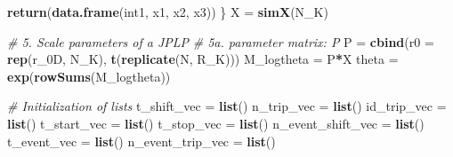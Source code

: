\documentclass[
]{article}
\newenvironment{Shaded}{\begin{snugshade}}{\end{snugshade}}
\newcommand{\CommentTok}[1]{\textcolor[rgb]{0.56,0.35,0.01}{\textit{#1}}}
\newcommand{\DataTypeTok}[1]{\textcolor[rgb]{0.13,0.29,0.53}{#1}}
\newcommand{\KeywordTok}[1]{\textcolor[rgb]{0.13,0.29,0.53}{\textbf{#1}}}
\newcommand{\NormalTok}[1]{#1}
\newcommand{\OperatorTok}[1]{\textcolor[rgb]{0.81,0.36,0.00}{\textbf{#1}}}
\newcommand{\StringTok}[1]{\textcolor[rgb]{0.31,0.60,0.02}{#1}}
\begin{document}
\begin{Shaded}
\begin{Highlighting}[]
    \KeywordTok{return}\NormalTok{(}\KeywordTok{data.frame}\NormalTok{(int1, x1, x2, x3))}
\NormalTok{  \}}
\NormalTok{  X =}\StringTok{ }\KeywordTok{simX}\NormalTok{(N_K)}

  \CommentTok{# 5. Scale parameters of a JPLP}
  \CommentTok{# 5a. parameter matrix: P}
\NormalTok{  P =}\StringTok{ }\KeywordTok{cbind}\NormalTok{(}\DataTypeTok{r0 =} \KeywordTok{rep}\NormalTok{(r_0D, N_K), }\KeywordTok{t}\NormalTok{(}\KeywordTok{replicate}\NormalTok{(N, R_K)))}
\NormalTok{  M_logtheta =}\StringTok{ }\NormalTok{P}\OperatorTok{*}\NormalTok{X}
\NormalTok{  theta =}\StringTok{ }\KeywordTok{exp}\NormalTok{(}\KeywordTok{rowSums}\NormalTok{(M_logtheta))}

  \CommentTok{# Initialization of lists}
\NormalTok{  t_shift_vec =}\StringTok{ }\KeywordTok{list}\NormalTok{()}
\NormalTok{  n_trip_vec =}\StringTok{ }\KeywordTok{list}\NormalTok{()}
\NormalTok{  id_trip_vec =}\StringTok{ }\KeywordTok{list}\NormalTok{()}
\NormalTok{  t_start_vec =}\StringTok{ }\KeywordTok{list}\NormalTok{()}
\NormalTok{  t_stop_vec =}\StringTok{ }\KeywordTok{list}\NormalTok{()}
\NormalTok{  n_event_shift_vec =}\StringTok{ }\KeywordTok{list}\NormalTok{()}
\NormalTok{  t_event_vec =}\StringTok{ }\KeywordTok{list}\NormalTok{()}
\NormalTok{  n_event_trip_vec =}\StringTok{ }\KeywordTok{list}\NormalTok{()}


\end{Highlighting}
\end{Shaded}
\end{document}
